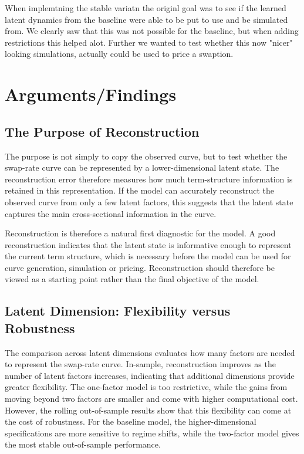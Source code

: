 When implemtning the stable variatn the originl goal was to see if the learned latent dynamics from the baseline were able to be put to use and be simulated from. We clearly saw that this was not possible for the baseline, but when adding restrictions this helped alot. Further we wanted to test whether this now "nicer" looking simulations, actually could be used to price a swaption. 

\section{Arguments/Findings}

\subsection{The Purpose of Reconstruction}

The purpose is not simply to copy the observed curve, but to test whether the swap-rate curve can be represented by a lower-dimensional latent state. The reconstruction error therefore measures how much term-structure information is retained in this representation. If the model can accurately reconstruct the observed curve from only a few latent factors, this suggests that the latent state captures the main cross-sectional information in the curve.

Reconstruction is therefore a natural first diagnostic for the model. A good reconstruction indicates that the latent state is informative enough to represent the current term structure, which is necessary before the model can be used for curve generation, simulation or pricing. Reconstruction should therefore be viewed as a starting point rather than the final objective of the model.


\subsection{Latent Dimension: Flexibility versus Robustness}

The comparison across latent dimensions evaluates how many factors are needed to represent the swap-rate curve. In-sample, reconstruction improves as the number of latent factors increases, indicating that additional dimensions provide greater flexibility. The one-factor model is too restrictive, while the gains from moving beyond two factors are smaller and come with higher computational cost. However, the rolling out-of-sample results show that this flexibility can come at the cost of robustness. For the baseline model, the higher-dimensional specifications are more sensitive to regime shifts, while the two-factor model gives the most stable out-of-sample performance.

